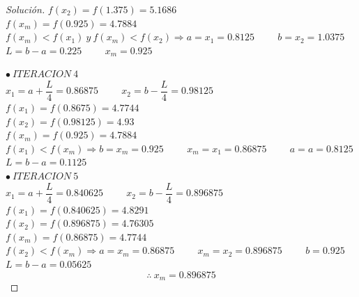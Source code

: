 \documentclass[12pt,oneside]{book}
\newenvironment{solution}{\begin{proof}[Solución]}{\end{proof}}
\begin{document}
\begin{solution}
	$f(x_2)=f(1.375)=5.1686$\\
	
	$f(x_m)=f(0.925)=4.7884$\\
	
	$f(x_m)<f(x_1) \ y\ f(x_m)<f(x_2) \Rightarrow a=x_1=0.8125 \hspace{1cm} b=x_2=1.0375 $\\
	
	$L=b-a=0.225 \hspace{1cm} x_m=0.925$
	
	$\bullet\ ITERACION\ 4$\\
	
	$x_1=a+\dfrac{L}{4}=0.86875 \hspace{1cm} x_2=b-\dfrac{L}{4}=0.98125$\\
	
	$f(x_1)=f(0.8675)=4.7744$\\
	
	$f(x_2)=f(0.98125)=4.93$\\
	
	$f(x_m)=f(0.925)=4.7884$\\
	
	$f(x_1)<f(x_m) \Rightarrow b=x_m=0.925 \hspace{1cm} x_m=x_1=0.86875 \hspace{1cm} a=a=0.8125$\\
	
	$L=b-a=0.1125$\\

	$\bullet\ ITERACION\ 5$\\
	
	$x_1=a+\dfrac{L}{4}=0.840625 \hspace{1cm} x_2=b-\dfrac{L}{4}=0.896875$\\
	
	$f(x_1)=f(0.840625)=4.8291$\\
	
	$f(x_2)=f(0.896875)=4.76305$\\
	
	$f(x_m)=f(0.86875)=4.7744$\\
	
	$f(x_2)<f(x_m) \Rightarrow a=x_m=0.86875 \hspace{1cm} x_m=x_2=0.896875 \hspace{1cm} b=0.925$\\
	
	$L=b-a=0.05625$\\
	
	$$\therefore\ x_m=0.896875$$
\end{solution}
\end{document}

